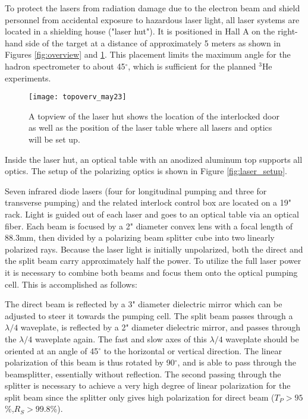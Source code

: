 To protect the lasers from radiation damage due to the electron beam
and shield personnel from accidental exposure to hazardous laser
light, all laser systems are located in a shielding house ("laser hut").
It is positioned in Hall A on the right-hand side of the target at a
distance of approximately 5 meters as shown in Figures
\ref{fig:overview} and \ref{fig:laserhut}.  This placement limits
the maximum angle for the hadron spectrometer to about 45$^\circ$,
which is sufficient for the planned $^3$He experiments.

\begin{figure}
\begin{center}
\centerline{\texttt{[image: topoverv\_may23]}}
\caption{ A topview of the laser hut shows the location
of the interlocked door as well as the position of the laser table where
all lasers and optics will be set up.}
\label{fig:laserhut}
\end{center}
\end{figure}
Inside the laser hut, an optical table with an anodized aluminum top
supports all optics. The setup of the
polarizing optics is shown in Figure \ref{fig:laser_setup}. 

Seven infrared diode lasers (four for longitudinal pumping and three
for transverse pumping) and the related interlock control box
 are located on a 19" rack.  Light is guided out of each laser and 
goes to an optical table via an optical fiber.  Each beam is focused by a 2" 
diameter convex lens with a focal length of 88.3mm, then divided by a polarizing
beam splitter cube into two linearly polarized rays.  Because the
laser light is initially unpolarized, both the direct and the split
beam carry approximately half the power. To utilize the full laser
power it is necessary to combine both beams and focus them onto the
optical pumping cell.  This is accomplished as follows:

The direct beam is reflected by a 3" diameter dielectric mirror which
can be adjusted to steer it towards the pumping cell.  The split beam
passes through a $\lambda/4$ waveplate, is reflected by a 2" diameter
dielectric mirror, and passes through the $\lambda/4$ waveplate again.  The 
fast and slow axes of this $\lambda/4$ waveplate should be oriented at an 
angle of 45$^\circ$ to the horizontal or vertical direction.  The
linear polarization of this beam is thus rotated by 90$^\circ$, and is
able to pass through the beamsplitter, essentially without
reflection.  The second passing through the splitter is necessary to
achieve a very high degree of linear polarization for the split beam
since the splitter only gives high polarization for direct beam 
($T_P>95$\%,$R_S>99.8$\%).

